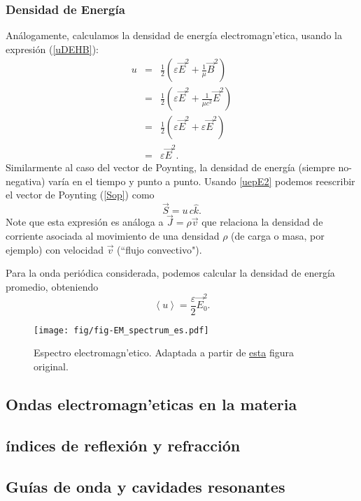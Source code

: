 \subsubsection{Densidad de Energía}
Análogamente, calculamos la densidad de energía electromagn'etica, usando la expresión (\ref{uDEHB}):
\begin{eqnarray}
 u&=&\frac{1}{2}\left(\varepsilon\vec{E}^2+\frac{1}{\mu}\vec{B}^2\right)\\
&=&\frac{1}{2}\left(\varepsilon\vec{E}^2+\frac{1}{\mu c^2}\vec{E}^2\right)\\
&=&\frac{1}{2}\left(\varepsilon\vec{E}^2+\varepsilon\vec{E}^2\right)\\
&=&\varepsilon\vec{E}^2. \label{uepE2}
\end{eqnarray}
Similarmente al caso del vector de Poynting, la densidad de energía (siempre no-negativa) varía en el tiempo y punto a punto. 
Usando \eqref{uepE2} podemos reescribir el vector de Poynting (\ref{Sop}) como
\begin{equation}
 \vec{S}=u\,c\hat{k}.
\end{equation}
Note que esta expresión es análoga a $\vec{J}=\rho\vec{v}$ que relaciona la densidad de corriente asociada al movimiento de una densidad $\rho$ (de carga o masa, por ejemplo) con velocidad $\vec{v}$ (``flujo convectivo").

Para la onda periódica considerada, podemos calcular la densidad de energía promedio, obteniendo
\begin{equation}\label{uprom}
\left<u\right>=\frac{\varepsilon}{2}\vec{E}_0^2.
\end{equation}

\begin{figure}[!h]
\centerline{\texttt{[image: fig/fig-EM\_spectrum\_es.pdf]}}
\caption{Espectro electromagn'etico. Adaptada a partir de \href{http://commons.wikimedia.org/wiki/File:EM_spectrum_es.svg}{esta} figura original.}
\label{fig:EMS}
\end{figure}

\subsection{Ondas electromagn'eticas en la materia}
\subsection{índices de reflexión y refracción}
\subsection{Guías de onda y cavidades resonantes}



